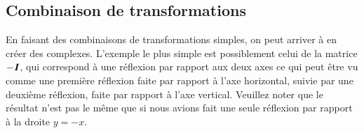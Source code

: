 \begin{figure}[h]
\hfill
{}
\end{figure}


\subsection{Combinaison de transformations}

En faisant des combinaisons de transformations simples, on peut arriver à en créer
des complexes.  L'exemple le plus simple est possiblement celui de la
matrice $-\boldsymbol{I}$, qui correspond à une réflexion par rapport aux deux axes ce qui peut
être vu comme une première réflexion faite par rapport à l'axe horizontal, suivie
par une deuxième réflexion, faite par rapport à l'axe vertical.  Veuillez noter
que le résultat n'est pas le même que si nous avions fait une seule réflexion
par rapport à la droite $y=-x$.

